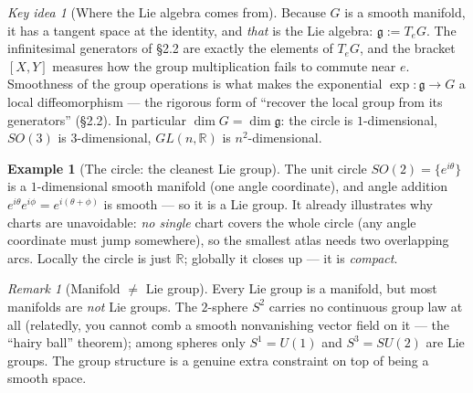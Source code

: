 \documentclass[11pt]{article}
\theoremstyle{definition}
\newtheorem{example}{Example}[section]
\theoremstyle{remark}
\newtheorem{remark}{Remark}[section]
\newtheorem*{keyidea}{Key idea}
\newcommand{\g}{\mathfrak{g}}
\newcommand{\R}{\mathbb{R}}
\begin{document}
\begin{keyidea}[Where the Lie algebra comes from]
Because $G$ is a smooth manifold, it has a tangent space at the identity, and \emph{that} is the Lie
algebra: $\g:=T_eG$. The infinitesimal generators of \S2.2 are exactly the elements of $T_eG$, and the
bracket $[X,Y]$ measures how the group multiplication fails to commute near $e$. Smoothness of the group
operations is what makes the exponential $\exp:\g\to G$ a local diffeomorphism --- the rigorous form of
``recover the local group from its generators'' (\S2.2). In particular $\dim G=\dim\g$: the circle is
$1$-dimensional, $SO(3)$ is $3$-dimensional, $GL(n,\R)$ is $n^2$-dimensional.
\end{keyidea}

\begin{example}[The circle: the cleanest Lie group]
The unit circle $SO(2)=\{e^{i\theta}\}$ is a $1$-dimensional smooth manifold (one angle coordinate), and
angle addition $e^{i\theta}e^{i\phi}=e^{i(\theta+\phi)}$ is smooth --- so it is a Lie group. It already
illustrates why charts are unavoidable: \emph{no single} chart covers the whole circle (any angle
coordinate must jump somewhere), so the smallest atlas needs two overlapping arcs. Locally the circle is
just $\R$; globally it closes up --- it is \emph{compact}.
\end{example}

\begin{remark}[Manifold $\ne$ Lie group]
Every Lie group is a manifold, but most manifolds are \emph{not} Lie groups. The $2$-sphere $S^2$ carries
no continuous group law at all (relatedly, you cannot comb a smooth nonvanishing vector field on it --- the
``hairy ball'' theorem); among spheres only $S^1=U(1)$ and $S^3=SU(2)$ are Lie groups. The group structure
is a genuine extra constraint on top of being a smooth space.
\end{remark}
\end{document}

